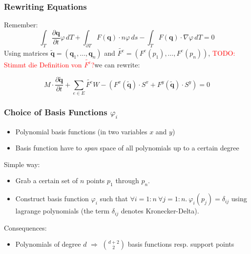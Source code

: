 \documentclass{beamer}
\newcommand{\todo}[1]{\textcolor{red}{TODO: #1}}
\newcommand{\pd}[2]{\dfrac{\partial #1}{\partial #2}}
\renewcommand{\phi}{\varphi}
\begin{document}
\begin{frame}
  \frametitle{Rewriting Equations}
  Remember:
  \begin{equation*}
    \int_T \pd {\mathbf{q}}{t} \phi \, dT +
    \int_{\partial T} F(\mathbf{q}) \cdot n \phi \, ds -
    \int_T F(\mathbf{q}) \cdot \nabla \phi \, dT = 0
  \end{equation*}
  Using matrices $\tilde{\mathbf{q}} = (\mathbf{q}_1,\dots,\mathbf{q}_n)$ and $\tilde{F^e}=(F^e(p_1),\dots,F^e(p_n))$, \todo{Stimmt die Definition von $\tilde{F^e}$?}we can rewrite:
  
  \begin{equation*}
    M \cdot \pd{\tilde{\mathbf{q}}}{t} +
    \sum_{e \in E} \tilde{F^e} W -
    \left(F^x(\tilde{\mathbf{q}}) \cdot S^x +
      F^y(\tilde{\mathbf{q}}) \cdot S^y\right) = 0
  \end{equation*}
\end{frame}

\begin{frame}
  \frametitle{Choice of Basis Functions $\phi_i$}
  \begin{itemize}
  \item Polynomial basis functions (in two variables $x$ and $y$)
  \item Basis function have to \emph{span} space of all polynomials up to a certain degree
  \end{itemize}
  Simple way:
  \begin{itemize}
  \item Grab a certain set of $n$ points $p_1$ through $p_{n}$.
  \item Construct basis function $\phi_i$ such that $\forall i=1:n \  \forall j=1:n. \ \phi_i(p_j) = \delta_{ij}$ using lagrange polynomials (the term $\delta_{ij}$ denotes Kronecker-Delta).
  \end{itemize}
  Consequences:
  \begin{itemize}
  \item Polynomials of degree $d$ $\Rightarrow$ $\binom{d+2}{2}$ basis functions resp. support points
  \end{itemize}
\end{frame}
\end{document}
